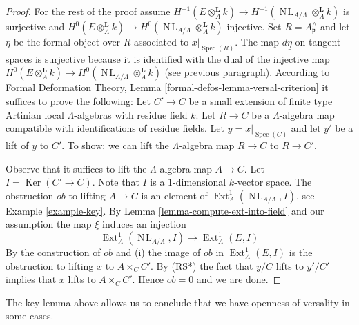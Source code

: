\documentclass{stacks-project}
\theoremstyle{plain}
\theoremstyle{definition}
\theoremstyle{remark}
\numberwithin{equation}{subsection}
\def\Spec{\mathop{\mathrm{Spec}}}
\def\Ext{\mathop{\mathrm{Ext}}\nolimits}
\def\NL{\mathop{N\!L}\nolimits}
\def\Ker{\mathop{\mathrm{Ker}}}
\begin{document}
\begin{proof}
\medskip\noindent
For the rest of the proof assume $H^{-1}(E \otimes_A^\mathbf{L} k) \to
H^{-1}(\NL_{A/\Lambda} \otimes_A^\mathbf{L} k)$
is surjective and
$H^0(E \otimes_A^\mathbf{L} k) \to
H^0(\NL_{A/\Lambda} \otimes_A^\mathbf{L} k)$
injective. Set $R = A_\mathfrak p^\wedge$ and let $\eta$ be the
formal object over $R$ associated to $x|_{\Spec(R)}$.
The map $d\underline{\eta}$ on tangent spaces is surjective
because it is identified with the dual of the injective map
$H^0(E \otimes_A^{\mathbf{L}} k) \to
H^0(\NL_{A/\Lambda} \otimes_A^{\mathbf{L}} k)$
(see previous paragraph). According to
Formal Deformation Theory, Lemma \ref{formal-defos-lemma-versal-criterion}
it suffices to prove the following:
Let $C' \to C$ be a small extension of finite type Artinian local
$\Lambda$-algebras with residue field $k$. Let $R \to C$ be a
$\Lambda$-algebra map compatible with identifications of residue fields.
Let $y = x|_{\Spec(C)}$ and let $y'$ be a lift of $y$ to $C'$.
To show: we can lift the $\Lambda$-algebra map $R \to C$ to $R \to C'$.

\medskip\noindent
Observe that it suffices to lift the $\Lambda$-algebra map $A \to C$.
Let $I = \Ker(C' \to C)$. Note that $I$ is a $1$-dimensional $k$-vector
space. The obstruction $ob$ to lifting $A \to C$ is an element of
$\Ext^1_A(\NL_{A/\Lambda}, I)$, see Example \ref{example-key}.
By Lemma \ref{lemma-compute-ext-into-field} and our assumption the map
$\xi$ induces an injection
$$
\Ext^1_A(\NL_{A/\Lambda}, I)
\longrightarrow
\Ext^1_A(E, I)
$$
By the construction of $ob$ and (i) the image of $ob$ in $\Ext^1_A(E, I)$
is the obstruction to lifting $x$ to $A \times_C C'$. By (RS*) the fact that
$y/C$ lifts to $y'/C'$ implies that $x$ lifts to $A \times_C C'$. Hence
$ob = 0$ and we are done.
\end{proof}

\noindent
The key lemma above allows us to conclude that we have openness of
versality in some cases.
\end{document}
